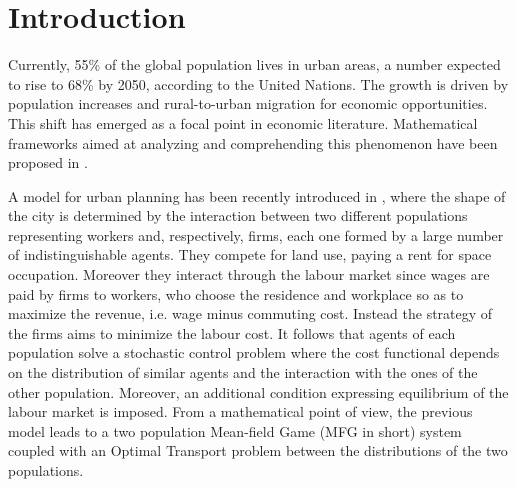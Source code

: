 \documentclass[smallextended,referee,envcountsect,]{svjour3}
\begin{document}
\section{Introduction}
Currently, 55\% of the global population lives in urban areas, a number expected to rise to 68\% by 2050, according to the United Nations. The growth is driven by population increases and rural-to-urban migration for economic opportunities.  This shift has emerged as a focal point in economic literature. Mathematical frameworks aimed at analyzing and comprehending this phenomenon have been proposed  in \cite{acpt,bagagiolo2,bagagiolo1,buttazzo,carlier,lucas}.
\par
A model for urban planning has been recently introduced in \cite{barilla}, where the shape of the city is  determined by the interaction  between two different populations representing workers and, respectively, firms, each one formed by a large number of indistinguishable agents. They compete for land use, paying a rent for space occupation. Moreover they interact through the labour market since wages are paid by firms to workers, who choose the residence and workplace so as to maximize the revenue, i.e. wage minus commuting cost. Instead the strategy of the firms aims to minimize the labour cost. It follows that  agents of each population solve  a stochastic control problem  where the cost functional depends on the distribution of similar agents and the interaction with the ones of the other population. Moreover, an additional condition expressing equilibrium of the labour market is imposed. From a mathematical point of view, the previous model leads to a two population Mean-field Game  (MFG in short) system \cite{lasry2007mean,huang2006large,cardaliaguet2012notes} coupled with an Optimal Transport problem \cite{villani2,santambrogio} between the distributions of the two populations.
\par
\end{document}
